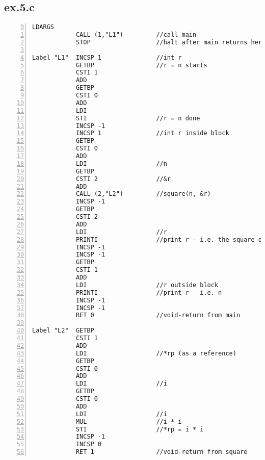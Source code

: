 \documentclass[a4paper, titlepage]{article}
\begin{document}
\subsection*{ex.5.c}
\begin{lstlisting}[numbers=left, firstnumber=0, title=ex5.c]
            LDARGS
            CALL (1,"L1")         //call main
            STOP                  //halt after main returns here

Label "L1"  INCSP 1               //int r
            GETBP                 //r = n starts
            CSTI 1
            ADD
            GETBP
            CSTI 0
            ADD
            LDI
            STI                   //r = n done
            INCSP -1
            INCSP 1               //int r inside block
            GETBP
            CSTI 0
            ADD
            LDI                   //n
            GETBP
            CSTI 2                //&r
            ADD
            CALL (2,"L2")         //square(n, &r)
            INCSP -1
            GETBP
            CSTI 2
            ADD
            LDI                   //r
            PRINTI                //print r - i.e. the square of n
            INCSP -1
            INCSP -1
            GETBP
            CSTI 1
            ADD
            LDI                   //r outside block
            PRINTI                //print r - i.e. n
            INCSP -1
            INCSP -1
            RET 0                 //void-return from main

Label "L2"  GETBP
            CSTI 1
            ADD
            LDI                   //*rp (as a reference)
            GETBP
            CSTI 0
            ADD
            LDI                   //i
            GETBP
            CSTI 0
            ADD
            LDI                   //i
            MUL                   //i * i
            STI                   //*rp = i * i
            INCSP -1
            INCSP 0
            RET 1                 //void-return from square
\end{lstlisting}
\end{document}
